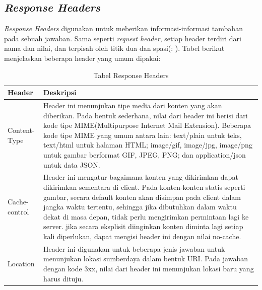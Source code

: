 \subsection{\textit{Response Headers}}
\label{subsec:responseheaders}

\textit{Response Headers} digunakan untuk meberikan informasi-informasi tambahan pada sebuah jawaban. Sama seperti \textit{request header}, setiap header terdiri dari nama dan nilai, dan terpisah oleh titik dua dan spasi(: ). Tabel berikut menjelaskan beberapa header yang umum dipakai:


\begin{table}[H]
\centering
\begin{tabular}{|p{3cm}|p{6cm}|}
\hline
\textbf{Header}        & \textbf{Deskripsi}                                                                                                                                                                                                                                                                                                                                                                                                                                                   \\\hline
Content-Type  & Header ini menunjukan tipe media dari konten yang akan diberikan. Pada bentuk sederhana, nilai dari header ini berisi dari kode tipe MIME(Multipurpose Internet Mail Extension). Beberapa kode tipe MIME yang umum antara lain: text/plain untuk teks, text/html untuk halaman HTML; image/gif, image/jpg, image/png untuk gambar berformat GIF, JPEG, PNG; dan application/json untuk data JSON.                                                           \\\hline
Cache-control & Header ini mengatur bagaimana konten yang dikirimkan dapat dikirimkan sementara di client. Pada konten-konten statis seperti gambar, secara default konten akan disimpan pada client dalam jangka waktu tertentu, sehingga jika dibutuhkan dalam waktu dekat di masa depan, tidak perlu mengirimkan permintaan lagi ke server. jika secara eksplisit diinginkan konten diminta lagi setiap kali diperlukan, dapat mengisi header ini dengan nilai no-cache. \\\hline
Location      & Header ini digunakan untuk beberapa jenis jawaban untuk menunjukan lokasi sumberdaya dalam bentuk URI. Pada jawaban dengan kode 3xx, nilai dari header ini menunjukan lokasi baru yang harus dituju.               \\\hline                                                                                                                        
\end{tabular}
\caption[Tabel Response Headers]{Tabel Response Headers}
\label{table:responseheaders}
\end{table}

